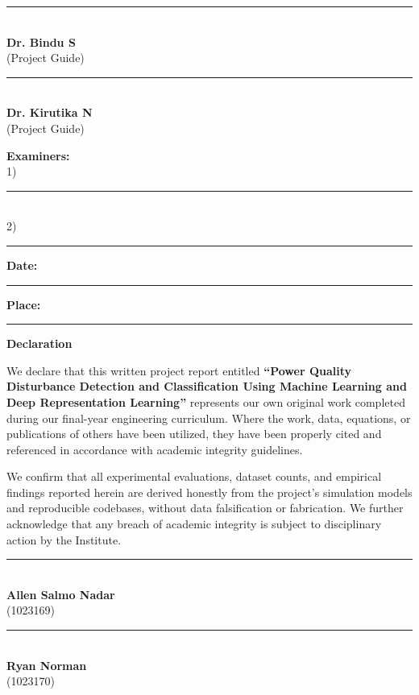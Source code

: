 \documentclass[12pt,a4paper]{report}
\begin{document}
\noindent
\begin{minipage}[t]{0.45\textwidth}
\centering
\rule{6cm}{0.4pt} \\[0.2cm]
\textbf{Dr. Bindu S} \\[0.1cm]
(Project Guide)
\end{minipage}
\hfill
\begin{minipage}[t]{0.45\textwidth}
\centering
\rule{6cm}{0.4pt} \\[0.2cm]
\textbf{Dr. Kirutika N} \\[0.1cm]
(Project Guide)
\end{minipage}

\vspace{2cm}

\noindent
\textbf{Examiners:}\\[1.2cm]
1) \rule{7cm}{0.4pt} \\[1.2cm]
2) \rule{7cm}{0.4pt} \par\vspace{1.8cm}

\noindent
\textbf{Date:} \rule{4cm}{0.4pt} \hfill \textbf{Place:} \rule{4cm}{0.4pt}
\clearpage

\begin{center}
    \vspace*{1.5cm}
    \textbf{\LARGE Declaration}\\[1.5cm]
\end{center}
\noindent
We declare that this written project report entitled \textbf{``Power Quality Disturbance Detection and Classification Using Machine Learning and Deep Representation Learning''} represents our own original work completed during our final-year engineering curriculum. Where the work, data, equations, or publications of others have been utilized, they have been properly cited and referenced in accordance with academic integrity guidelines.

\noindent
We confirm that all experimental evaluations, dataset counts, and empirical findings reported herein are derived honestly from the project's simulation models and reproducible codebases, without data falsification or fabrication. We further acknowledge that any breach of academic integrity is subject to disciplinary action by the Institute.\par\vspace{3cm}

\noindent
\begin{minipage}[t]{0.45\textwidth}
\centering
\rule{6cm}{0.4pt} \\[0.2cm]
\textbf{Allen Salmo Nadar} \\
(1023169)
\end{minipage}
\hfill
\begin{minipage}[t]{0.45\textwidth}
\centering
\rule{6cm}{0.4pt} \\[0.2cm]
\textbf{Ryan Norman} \\
(1023170)
\end{minipage}
\end{document}
